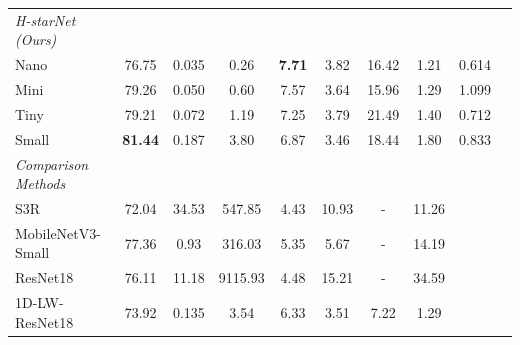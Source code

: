 \begin{table}[htbp]
\begin{tabular}{lccccccccc}
        \midrule
        \textit{H-starNet (Ours)} & & & & & & & & \\
        \quad Nano  & 76.75 & 0.035 & 0.26 & \textbf{7.71} & 3.82 & 16.42 & 1.21 & 0.614 \\
        \quad Mini  & 79.26 & 0.050 & 0.60 & 7.57 & 3.64 & 15.96 & 1.29 & 1.099\\
        \quad Tiny  & 79.21 & 0.072 & 1.19 & 7.25 & 3.79 & 21.49 & 1.40 & 0.712\\
        \quad Small & \textbf{81.44} & 0.187 & 3.80 & 6.87 & 3.46 & 18.44 & 1.80 & 0.833\\
        \midrule
        \textit{Comparison Methods} & & & & & & & & \\
        \quad S3R & 72.04 & 34.53 & 547.85 & 4.43 & 10.93 & - & 11.26 & \\
        \quad MobileNetV3-Small & 77.36 & 0.93 & 316.03 & 5.35 & 5.67 & - & 14.19 & \\
        \quad ResNet18 & 76.11 & 11.18 & 9115.93 & 4.48 & 15.21 & - & 34.59 & \\
        \quad 1D-LW-ResNet18  & 73.92 & 0.135 & 3.54 & 6.33 & 3.51 & 7.22 & 1.29 & \\
        \bottomrule
    \end{tabular}
\end{table}
